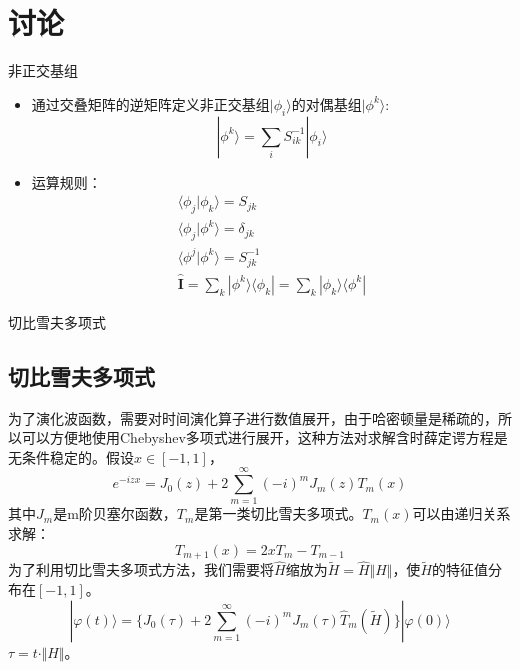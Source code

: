 \documentclass[10pt,aspectratio=169]{beamer}
\begin{document}
\section{讨论}
\begin{frame}{非正交基组}
    \begin{itemize}
        \item 通过交叠矩阵的逆矩阵定义非正交基组$|\phi_i\rangle$的对偶基组$|\phi^k\rangle$:
    \begin{equation}
        |\phi^k\rangle=\sum_{i}S^{-1}_{ik}|\phi_i\rangle
    \end{equation}
    \item 运算规则：
    \begin{equation}
        \begin{gathered}
            \langle\phi_j|\phi_k\rangle=S_{jk}\\
            \langle\phi_j|\phi^k\rangle=\delta_{jk}\\
            \langle\phi^j|\phi^k\rangle=S^{-1}_{jk}\\
            \hat{\mathbf{I}}=\sum_{k}|\phi^k\rangle\langle\phi_k|=\sum_{k}|\phi_k\rangle\langle\phi^k|
        \end{gathered}
    \end{equation}
\end{itemize}
\end{frame}
\begin{frame}{切比雪夫多项式}
\subsection{切比雪夫多项式}
为了演化波函数，需要对时间演化算子进行数值展开，由于哈密顿量是稀疏的，所以可以方便地使用Chebyshev多项式进行展开，这种方法对求解含时薛定谔方程是无条件稳定的。假设$x\in[-1,1]$，
\begin{equation}
    e^{-izx}=J_0(z)+2\sum_{m=1}^{\infty}(-i)^mJ_m(z)T_m(x)
\end{equation}
 其中$J_m$是m阶贝塞尔函数，$T_m$是第一类切比雪夫多项式。$T_m(x)$可以由递归关系求解：
\begin{equation}
    T_{m+1}(x)=2xT_{m}-T_{m-1}
\end{equation}
为了利用切比雪夫多项式方法，我们需要将$\hat{H}$缩放为$\tilde{H}=\hat{H}\Vert H\Vert$，使$\tilde{H}$的特征值分布在$[-1,1]$。
\begin{equation}
    |\varphi(t)\rangle=\{J_0(\tau)+2\sum_{m=1}^{\infty}(-i)^mJ_m(\tau)\hat{T}_m(\tilde{H})\}|\varphi(0)\rangle
\end{equation}
$\tau=t\cdot\Vert H\Vert$。
\end{frame}
\end{document}
